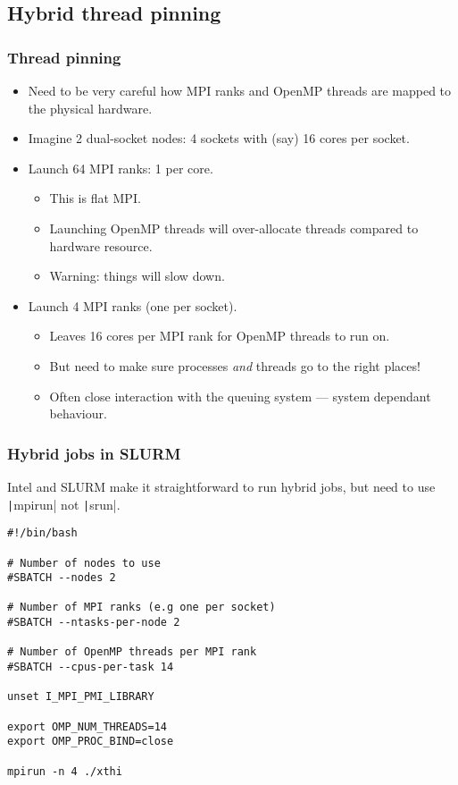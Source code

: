 \documentclass{beamer}
\begin{document}
\subsection{Hybrid thread pinning}
\begin{frame}
\frametitle{Thread pinning}
\begin{itemize}
  \item Need to be very careful how MPI ranks and OpenMP threads are mapped to the physical hardware.
  \item Imagine 2 dual-socket nodes: 4 sockets with (say) 16 cores per socket.
  \item Launch 64 MPI ranks: 1 per core.
    \begin{itemize}
      \item This is flat MPI.
      \item Launching OpenMP threads will over-allocate threads compared to hardware resource.
      \item Warning: things will slow down.
    \end{itemize}
  \item Launch 4 MPI ranks (one per socket).
    \begin{itemize}
      \item Leaves 16 cores per MPI rank for OpenMP threads to run on.
      \item But need to make sure processes \emph{and} threads go to the right places!
      \item Often close interaction with the queuing system --- system dependant behaviour.
    \end{itemize}
\end{itemize}
\end{frame}

\begin{frame}[fragile]
\frametitle{Hybrid jobs in SLURM}

Intel and SLURM make it straightforward to run hybrid jobs, but need to use \texttt|mpirun| not \texttt|srun|.

\begin{verbatim}
#!/bin/bash

# Number of nodes to use
#SBATCH --nodes 2

# Number of MPI ranks (e.g one per socket)
#SBATCH --ntasks-per-node 2

# Number of OpenMP threads per MPI rank
#SBATCH --cpus-per-task 14

unset I_MPI_PMI_LIBRARY

export OMP_NUM_THREADS=14 
export OMP_PROC_BIND=close

mpirun -n 4 ./xthi

\end{verbatim}

\end{frame}
\end{document}
